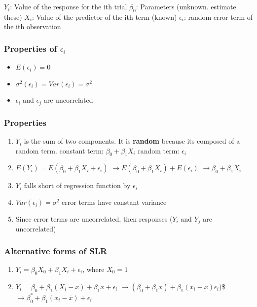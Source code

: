 \documentclass[11pt]{article}
\begin{document}
\(Y_i\): Value of the response for the ith trial
\(\beta_0\): Parameters (unknown. estimate these)
\(X_i\): Value of the predictor of the ith term (known)
\(\epsilon_i\): random error term of the ith observation
\subsubsection{Properties of \(\epsilon_i\)}
\label{sec:orgf3501c4}
\begin{itemize}
\item \(E(\epsilon_i) = 0\)
\item \(\sigma^2(\epsilon_i) = Var(\epsilon_i) = \sigma^2\)
\item \(\epsilon_i\) and \(\epsilon_j\) are uncorrelated
\end{itemize}
\subsubsection{Properties}
\label{sec:org83f79fd}
\begin{enumerate}
\item \(Y_i\) is the sum of two components. It is \textbf{random} because its composed of a
random term.
constant term: \(\beta_0 + \beta_1 X_i\)
random term: \(\epsilon_i\)
\item \(E(Y_i) = E(\beta_0 + \beta_1 X_i + \epsilon_i)\)
\(\to E(\beta_0 + \beta_1 X_i) + E(\epsilon_i)\)
\(\to \beta_0 + \beta_1 X_i\)
\item \(Y_i\) falls short of regression function by \(\epsilon_i\)
\item \(Var(\epsilon_i) = \sigma^2\) error terms have constant variance
\item Since error terms are uncorrelated, then responses (\(Y_i\) and \(Y_j\) are
uncorrelated)
\end{enumerate}

\subsubsection{Alternative forms of SLR}
\label{sec:orgc0c4343}
\begin{enumerate}
\item \(Y_i = \beta_0 X_0 + \beta_1 X_i + \epsilon_i\), where \(X_0 = 1\)
\item \(Y_i = \beta_0 + \beta_1 (X_i - \bar{x}) + \beta_1 \bar{x} + \epsilon_i\)
\(\to (\beta_0 + \beta_1 \bar{x}) + \beta_1 (x_i - \bar{x}) \epsilon_i\))\$
\(\to \beta_0^* + \beta_1(x_i - \bar{x}) + \epsilon_i\)
\end{enumerate}
\end{document}
